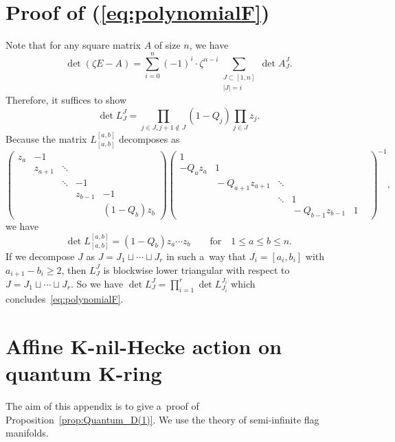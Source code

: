 \documentclass[pdftex]{sigma}
\numberwithin{equation}{section}
\theoremstyle{definition}
\begin{document}
\section{Proof of (\ref{eq:polynomialF})}
\label{sec:F}
Note that for any square matrix $A$ of size $n$, we have
\[
\det(\zeta E-A)=
\sum_{i=0}^n(-1)^i\cdot \zeta^{n-i}
\sum_{
\substack{
J\subset [1,n]\\
|J|=i
}
}
\det A_J^J.
\]
Therefore, it suffices to show
\[
\det L_J^J=
\prod_{j\in J,j+1\notin J}(1-Q_j)
\prod_{j\in J}z_j.
\]
Because the matrix $L^{[a,b]}_{[a,b]}$ decomposes as
\[
\begin{pmatrix}
z_a & -1 && & \\
 & z_{a+1}&\ddots& &\\
 & &\ddots& -1 &\\
 & &&\!z_{b-1}&-1\\
 &&&&\!\!\!\!\!(1-Q_b)z_b
\end{pmatrix}
\begin{pmatrix}
1 & & && & \\
-Q_az_a & 1 && & \\
 &\!\!\!\!\!\!\!-Q_{a+1}z_{a+1} &\ddots& &\\
 & & \ddots &1&\\
 &&&\!\!\!\!\!\!\!\!\!-Q_{b-1}z_{b-1}&1
\end{pmatrix}^{-1},
\]
we have
\[
\det L^{[a,b]}_{[a,b]}=
(1-Q_b)z_a\cdots z_b
\qquad
\text{for}\quad 1\le a\le b\le n.
\]
If we decompose
$J$ as
$J=J_1\sqcup \cdots\sqcup J_r$ in such a~way that
$J_i=[a_i,b_i]$
with $a_{i+1}-b_i\ge 2 $, then
$L_J^J$ is blockwise lower triangular with respect to
$J=J_1\sqcup \cdots\sqcup J_r$. So we have
$\det L_J^J
=\prod_{i=1}^r \det L_{J_i}^{J_i}$
which concludes~\eqref{eq:polynomialF}.

\section[Affine K-nil-Hecke action on quantum K-ring]{Affine $\boldsymbol{K}$-nil-Hecke action on quantum $\boldsymbol{ K}$-ring}\label{sec:nil-Hecke_on_QK}
The aim of this appendix is to give a~proof of Proposition~\ref{prop:Quantum_D(1)}. We use the theory of
semi-infinite flag manifolds.
\end{document}
